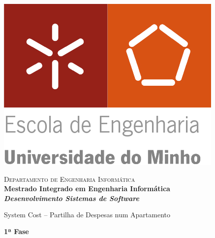 \begin{titlepage}


\begin{minipage}{0.3\textwidth}
\begin{flushleft} 
\includegraphics[width=\textwidth]{logo}
\end{flushleft}
\end{minipage}
\begin{minipage}{0.6\textwidth}
\begin{flushright} 

\textsc{Departamento de Engenharia Informática}\\[0.1cm]
\bfseries Mestrado Integrado em Engenharia Informática \\ [0.1cm]
\bfseries \textit{Desenvolvimento Sistemas de Software}\\[8mm]

\end{flushright}
\end{minipage}


\vspace{3cm}


\begin{center}


\LARGE System Cost – Partilha de Despesas num Apartamento 
\vspace{3ex}


\LARGE \textbf{1ª Fase }\\[1.5cm]





\end{center}
\end{titlepage}
